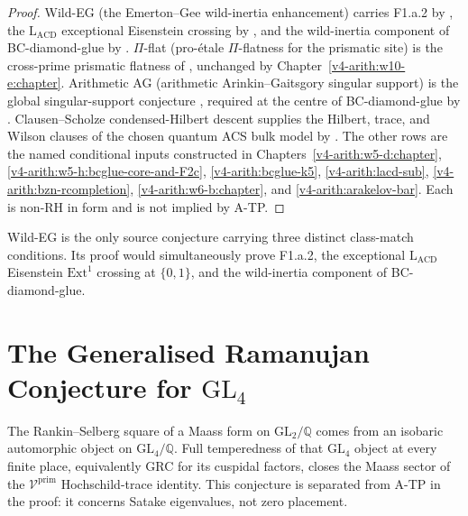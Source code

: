 \begin{proof}
Wild-EG (the Emerton--Gee wild-inertia enhancement) carries F1.a.2 by
, the
\(\mathrm{L}_{\mathrm{ACD}}\) exceptional Eisenstein crossing by
, and the wild-inertia
component of BC-diamond-glue by
.
\(\Pi\)-flat (pro-\'etale \(\Pi\)-flatness for the prismatic site) is
the cross-prime prismatic flatness of
, unchanged by
Chapter~\ref{v4-arith:w10-e:chapter}. Arithmetic AG (arithmetic
Arinkin--Gaitsgory singular support) is the global singular-support
conjecture , required at the centre
of BC-diamond-glue by .
Clausen--Scholze condensed-Hilbert descent supplies the Hilbert, trace,
and Wilson clauses of the chosen quantum ACS bulk model by
.
The other rows are the named conditional inputs constructed in
Chapters~\ref{v4-arith:w5-d:chapter},
\ref{v4-arith:w5-h:bcglue-core-and-F2c},
\ref{v4-arith:bcglue-k5},
\ref{v4-arith:lacd-sub}, \ref{v4-arith:bzn-rcompletion},
\ref{v4-arith:w6-b:chapter}, and
\ref{v4-arith:arakelov-bar}.  Each is non-RH in form and is not
implied by A-TP.
\end{proof}

\begin{remark}
\label{v4-arith:w10-final:rem:wild-eg}
Wild-EG is the only source conjecture carrying three distinct
class-match conditions. Its proof would simultaneously prove F1.a.2,
the exceptional \(\mathrm{L}_{\mathrm{ACD}}\) Eisenstein
\(\mathrm{Ext}^{1}\) crossing at \(\{0,1\}\), and the wild-inertia
component of BC-diamond-glue.
\end{remark}

\section{The Generalised Ramanujan Conjecture for
\texorpdfstring{\(\mathrm{GL}_{4}\)}{GL\_4}}
\label{v4-arith:w10-final:sub-rh}

The Rankin--Selberg square of a Maass form on \(\mathrm{GL}_{2}/\mathbb{Q}\)
comes from an isobaric automorphic object on
\(\mathrm{GL}_{4}/\mathbb{Q}\). Full temperedness of that
\(\mathrm{GL}_{4}\) object at every finite place, equivalently GRC for
its cuspidal factors, closes the Maass sector of the
\(\mathcal{V}^{\mathrm{prim}}\) Hochschild-trace identity. This
conjecture is separated from A-TP in the proof: it concerns Satake
eigenvalues, not zero placement.

